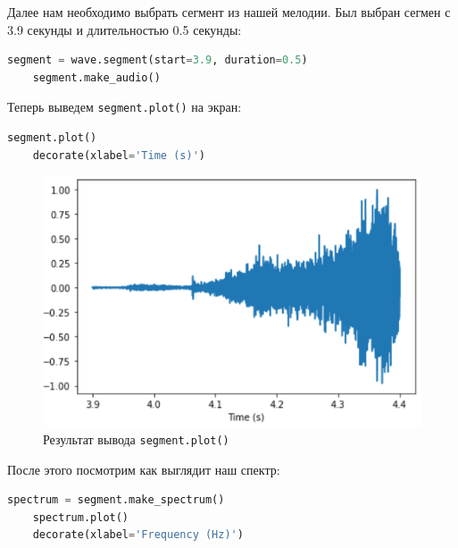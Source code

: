 \documentclass[a4paper]{article}
\begin{document}
            Далее нам необходимо выбрать сегмент из нашей мелодии. Был выбран сегмен с 3.9 секунды и длительностью 0.5 секунды:
            
\begin{lstlisting}[language=Python, caption= Выбор сегмента]
    segment = wave.segment(start=3.9, duration=0.5)
    segment.make_audio()
\end{lstlisting}

            Теперь выведем \texttt{segment.plot()} на экран:
            
\begin{lstlisting}[language=Python, caption= Вывод \texttt{segment.plot()}]
    segment.plot()
    decorate(xlabel='Time (s)')
\end{lstlisting}
            
            \begin{figure}[H]
                \centering
                \includegraphics[width=\textwidth]{segment_plot.png}
                \caption{Результат вывода \texttt{segment.plot()}}
                \label{fig:result_output_2}
            \end{figure}
            
            После этого посмотрим как выглядит наш спектр:
            
\begin{lstlisting}[language=Python, caption= Изображение спектра]
    spectrum = segment.make_spectrum()
    spectrum.plot()
    decorate(xlabel='Frequency (Hz)')
\end{lstlisting}
\end{document}
